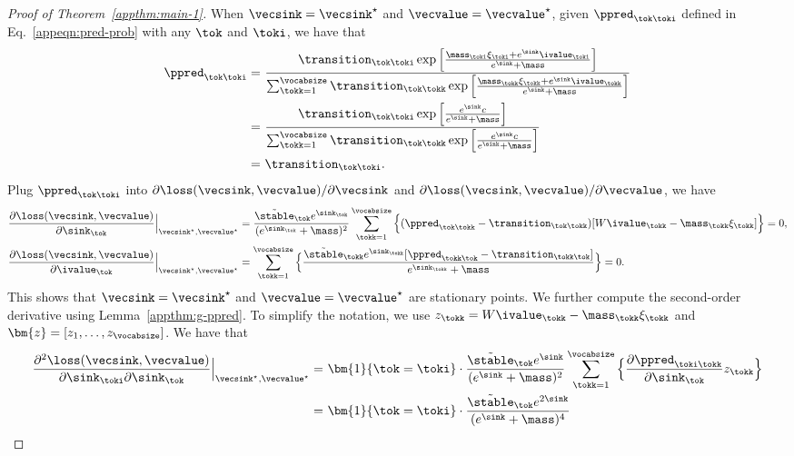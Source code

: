 \begin{proof}[Proof of Theorem~\ref{appthm:main-1}]
When $\vecsink=\vecsink^\star$ and $\vecvalue=\vecvalue^\star$, given $\ppred_{\tok\toki}$ defined in Eq.~\eqref{appeqn:pred-prob} with any $\tok$ and $\toki$, we have that
\begin{align*}
\ppred_{\tok\toki} = &~ \frac{\transition_{\tok\toki} \exp\Big[\frac{\mass_\toki\xi_\toki+e^{\sink}\ivalue_\toki}{e^{\sink}+\mass}\Big]}{\sum_{\tokk=1}^\vocabsize \transition_{\tok\tokk}\exp\Big[\frac{\mass_\tokk\xi_\tokk+e^{\sink}\ivalue_\tokk}{e^{\sink}+\mass}\Big]} \\
 = &~ \frac{\transition_{\tok\toki} \exp\Big[\frac{e^{\sink}c}{e^{\sink}+\mass}\Big]}{\sum_{\tokk=1}^\vocabsize \transition_{\tok\tokk}\exp\Big[\frac{e^{\sink}c}{e^{\sink}+\mass}\Big]} \\
 = &~ \transition_{\tok\toki}.
\end{align*}
Plug $\ppred_{\tok\toki}$ into $\partial \loss(\vecsink,\vecvalue)/\partial \vecsink$ and $\partial \loss(\vecsink,\vecvalue)/\partial \vecvalue$, we have
\begin{align*}
\frac{\partial \loss(\vecsink,\vecvalue)}{\partial \sink_\tok}\Big |_{\vecsink^\star,\vecvalue^\star} & = \frac{\Tilde{\stable}_\tok e^{\sink_\tok}}{(e^{\sink_\tok}+\mass)^2} 
\sum_{\tokk=1}^\vocabsize \Big\{(\ppred_{\tok\tokk}-\transition_{\tok\tokk}) [W \ivalue_\tokk -\mass_\tokk \xi_\tokk]
\Big\} = 0,\\
\frac{\partial \loss(\vecsink,\vecvalue)}{\partial \ivalue_\tok}\Big |_{\vecsink^\star,\vecvalue^\star} & = \sum_{\tokk=1}^\vocabsize \Big\{\frac{\Tilde{\stable}_\tokk e^{\sink_\tokk} [\ppred_{\tokk\tok}-\transition_{\tokk\tok} ]}{e^{\sink_\tokk}+\mass}\Big\} = 0.
\end{align*}
This shows that $\vecsink=\vecsink^\star$ and $\vecvalue=\vecvalue^\star$ are stationary points. We further compute the second-order derivative using Lemma~\ref{appthm:g-ppred}. To simplify the notation, we use $z_\tokk = W \ivalue_\tokk -\mass_\tokk \xi_\tokk$ and $\bm{z}=[z_1,\ldots,z_\vocabsize]$. We have that
\begin{align*}
\frac{\partial^2 \loss(\vecsink, \vecvalue)}{\partial \sink_\toki \partial \sink_\tok} \Big |_{\vecsink^\star,\vecvalue^\star} =  ~& \bm{1}\{\tok=\toki\}\cdot \frac{\Tilde{\stable}_\tok e^{\sink}}{(e^{\sink}+\mass)^2} 
\sum_{\tokk=1}^\vocabsize \Big\{\frac{\partial \ppred_{\toki\tokk}}{\partial \sink_\tok} z_\tokk
\Big\}\\
=  ~& \bm{1}\{\tok=\toki\}\cdot \frac{\Tilde{\stable}_\tok e^{2\sink}}{(e^{\sink}+\mass)^4} 

\end{align*}
\end{proof}
